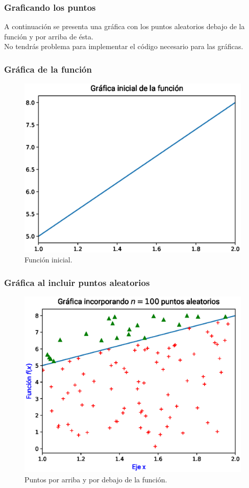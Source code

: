\documentclass[12pt]{beamer}
\begin{document}
\begin{frame}
\frametitle{Graficando los puntos}
A continuación se presenta una gráfica con los puntos aleatorios debajo de la función y por arriba de ésta.
\\
\bigskip
\pause
No tendrás problema para implementar el código necesario para las gráficas.
\end{frame}
\begin{frame}
\frametitle{Gráfica de la función}
\begin{figure}
	\centering
	\includegraphics[scale=0.55]{Imagenes/area_puntos_01.eps}
    \caption{Función inicial.}
\end{figure}
\end{frame}
\begin{frame}
\frametitle{Gráfica al incluir puntos aleatorios}
\begin{figure}
    \centering
    \includegraphics[scale=0.55]{Imagenes/area_puntos_02.eps}
    \caption{Puntos por arriba y por debajo de la función.}
\end{figure}
\end{frame}
\end{document}
